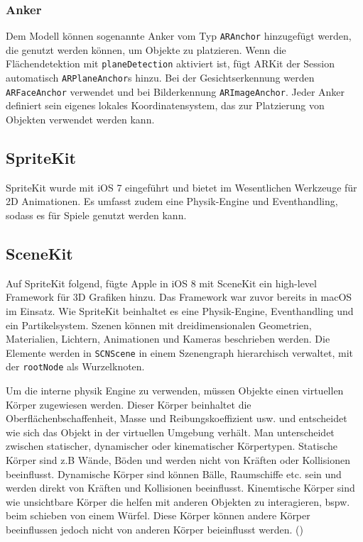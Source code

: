 
\subsubsection{Anker}
Dem Modell können sogenannte Anker vom Typ \texttt{ARAnchor} hinzugefügt werden, die genutzt werden können, um Objekte zu platzieren. Wenn die Flächendetektion mit \texttt{planeDetection} aktiviert ist, fügt ARKit der Session automatisch \texttt{ARPlaneAnchor}s hinzu. Bei der Gesichtserkennung werden \texttt{ARFaceAnchor} verwendet und bei Bilderkennung \texttt{ARImageAnchor}. Jeder Anker definiert sein eigenes lokales Koordinatensystem, das zur Platzierung von Objekten verwendet werden kann.


\subsection{SpriteKit}
SpriteKit wurde mit iOS 7 eingeführt und bietet im Wesentlichen Werkzeuge für 2D Animationen. Es umfasst zudem eine Physik-Engine und Eventhandling, sodass es für Spiele genutzt werden kann.


\subsection{SceneKit} \label{sub:scene-kit}
Auf SpriteKit folgend, fügte Apple in iOS 8 mit SceneKit ein high-level Framework für 3D Grafiken hinzu. Das Framework war zuvor bereits in macOS im Einsatz. Wie SpriteKit beinhaltet es eine Physik-Engine, Eventhandling und ein Partikelsystem. Szenen können mit dreidimensionalen Geometrien, Materialien, Lichtern, Animationen und Kameras beschrieben werden. Die Elemente werden in \texttt{SCNScene} in einem Szenengraph hierarchisch verwaltet, mit der \texttt{rootNode} als Wurzelknoten.

Um die interne physik Engine zu verwenden, müssen Objekte einen virtuellen Körper zugewiesen werden. Dieser Körper beinhaltet die Oberflächenbschaffenheit, Masse und Reibungskoeffizient usw. und entscheidet wie sich das Objekt in der virtuellen Umgebung verhält. Man unterscheidet zwischen statischer, dynamischer oder kinematischer Körpertypen. Statische Körper sind z.B Wände, Böden und werden nicht von Kräften oder Kollisionen beeinflusst. Dynamische Körper sind können Bälle, Raumschiffe etc. sein und werden direkt von Kräften und Kollisionen beeinflusst. Kinemtische Körper sind wie unsichtbare Körper die helfen mit anderen Objekten zu interagieren, bspw. beim schieben von einem Würfel. Diese Körper können andere Körper beeinflussen jedoch nicht von anderen Körper beieinflusst werden. (\cite{arkit-physics})

